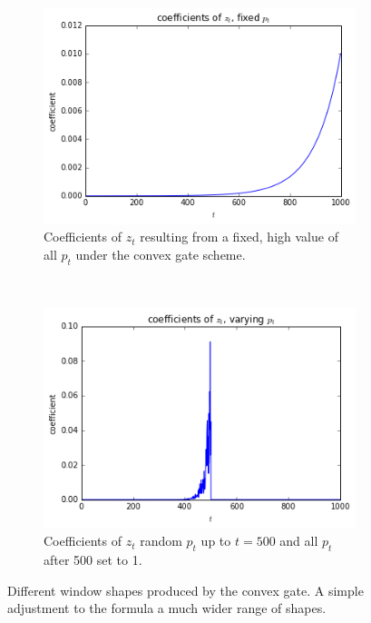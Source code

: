 \begin{figure}[t]
\centering
\begin{subfigure}[t]{0.45\textwidth}
	\centering
	\includegraphics[width=\textwidth]{newarchs/cvexexp}
	\caption{Coefficients of \(z_t\) resulting from a fixed, high value of all \(p_t\)
	under the convex gate scheme.}
\end{subfigure}~
\begin{subfigure}[t]{0.45\textwidth}
	\centering
	\includegraphics[width=\textwidth]{newarchs/cvexspike}
	\caption{Coefficients of \(z_t\) random \(p_t\) up to \(t=500\) and all \(p_t\) after
	500 set to 1.}
\end{subfigure}
\caption[Convex gate shapes]{Different window shapes produced by the convex gate.
 A simple adjustment to the formula
a much wider range of shapes.}
\label{fig:cvexgates}
\end{figure}

